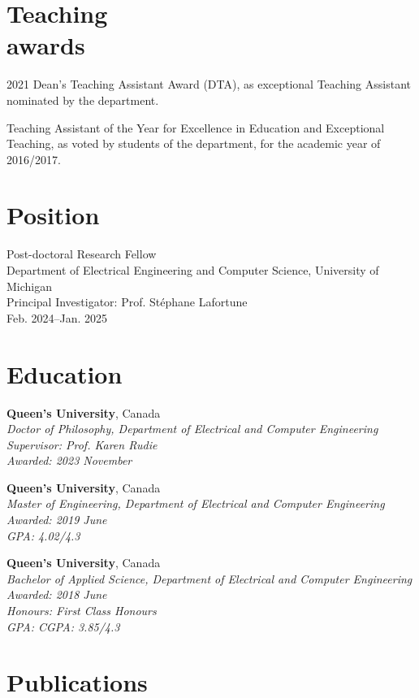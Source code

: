 \documentclass[margin]{res}
\begin{document}
\begin{resume}
\section{Teaching\\awards}
2021 Dean's Teaching Assistant Award (DTA), as exceptional Teaching Assistant nominated by the department.

Teaching Assistant of the Year for Excellence in Education and Exceptional Teaching, as voted by students of the department, for the academic year of 2016/2017.

\section{Position}

Post-doctoral Research Fellow\\
Department of Electrical Engineering and Computer Science, University of Michigan\\
Principal Investigator: Prof. Stéphane Lafortune\\
\null\qquad Feb. 2024--Jan. 2025

\section{Education}
\textbf{Queen's University}, Canada\\
{\sl Doctor of Philosophy, Department of Electrical and Computer Engineering\\
Supervisor: Prof. Karen Rudie\\
Awarded:
\hfill 2023 November}

\textbf{Queen's University}, Canada\\
{\sl Master of Engineering, Department of Electrical and Computer Engineering\\
Awarded:
\hfill 2019 June\\
GPA:
\hfill 4.02/4.3}

\textbf{Queen's University}, Canada\\
{\sl Bachelor of Applied Science, Department of Electrical and Computer Engineering\\
Awarded:
\hfill 2018 June\\
Honours:
\hfill First Class Honours\\
GPA: 
\hfill CGPA: 3.85/4.3}


\section{Publications}


\end{resume}
\end{document}
